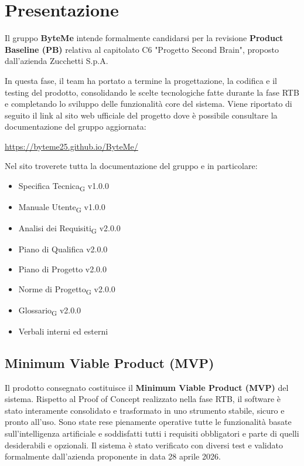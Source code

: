 \documentclass[11pt,a4paper]{article}
\newcommand{\gls}[1]{#1\textsubscript{G}}
\begin{document}
\setcounter{page}{1}

\section{Presentazione}
Il gruppo \textbf{ByteMe} intende formalmente candidarsi per la revisione \textbf{Product Baseline (PB)} relativa al capitolato C6 "Progetto Second Brain", proposto dall'azienda Zucchetti S.p.A.

In questa fase, il team ha portato a termine la progettazione, la codifica e il testing del prodotto, consolidando le scelte tecnologiche fatte durante la fase RTB e completando lo sviluppo delle funzionalità core del sistema. Viene riportato di seguito il link al sito web ufficiale del progetto dove è possibile consultare la documentazione del gruppo aggiornata:
\begin{center}
    \url{https://byteme25.github.io/ByteMe/}
\end{center}

\noindent Nel sito troverete tutta la documentazione del gruppo e in particolare:
\begin{itemize}
    \item {\gls{Specifica Tecnica} v1.0.0}
    \item {\gls{Manuale Utente} v1.0.0}
    \item {\gls{Analisi dei Requisiti} v2.0.0}
    \item {Piano di Qualifica v2.0.0}
    \item {Piano di Progetto v2.0.0}
    \item {\gls{Norme di Progetto} v2.0.0}
    \item {\gls{Glossario} v2.0.0}
    \item {Verbali interni ed esterni}
\end{itemize}


\subsection{Minimum Viable Product (MVP)}
Il prodotto consegnato costituisce il \textbf{Minimum Viable Product (MVP)} del sistema. Rispetto al Proof of Concept realizzato nella fase RTB, il software è stato interamente consolidato e trasformato in uno strumento stabile, sicuro e pronto all'uso. Sono state rese pienamente operative tutte le funzionalità basate sull'intelligenza artificiale e soddisfatti tutti i requisiti obbligatori e parte di quelli desiderabili e opzionali. Il sistema è stato verificato con diversi test e validato formalmente dall'azienda proponente in data 28 aprile 2026.
\end{document}
